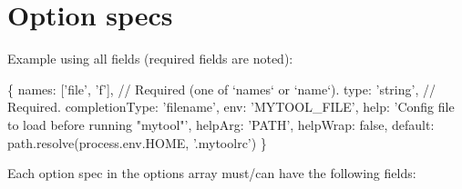\section*{Option specs}

Example using all fields (required fields are noted)\+:


\begin{DoxyCode}
\{
    names: ['file', 'f'],       // Required (one of `names` or `name`).
    type: 'string',             // Required.
    completionType: 'filename',
    env: 'MYTOOL\_FILE',
    help: 'Config file to load before running "mytool"',
    helpArg: 'PATH',
    helpWrap: false,
    default: path.resolve(process.env.HOME, '.mytoolrc')
\}
\end{DoxyCode}


Each option spec in the {\ttfamily options} array must/can have the following fields\+:


